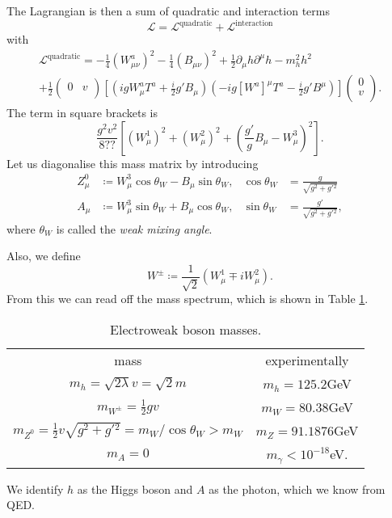 
The Lagrangian is then a sum of quadratic and interaction terms
\begin{equation}
  \mathscr{L} = \mathscr{L}^{\text{quadratic}} + \mathscr{L}^{\text{interaction}}
\end{equation}
with
\begin{multline}
  \mathscr{L}^{\text{quadratic}} = -\frac{1}{4} (W_{\mu\nu}^{a})^2 - \frac{1}{4} (B_{\mu\nu})^2 + \frac{1}{2} \partial_{\mu} h \partial^{\mu} h - m^2_h h^2 \\
  + \frac{1}{2}
  \begin{pmatrix}
   0 & v \\
  \end{pmatrix}
  \left[ (i g W^{a}_{\mu} T^{a} + \frac{i}{2} g' B_{\mu}) (-ig [W^{a}]^{\mu} T^{a} - \frac{i}{2} g' B^{\mu}) \right] 
  \begin{pmatrix}
  0 \\
  v \\
  \end{pmatrix}.
\end{multline}
The term in square brackets is
\begin{equation}
  \frac{g^2 v^2}{8 ??}  \left[ (W^1_{\mu})^2 + (W^2_{\mu})^2 + (\frac{g'}{g} B_{\mu} - W^3_{\mu})^2 \right].
\end{equation}
Let us diagonalise this mass matrix by introducing
\begin{align}
  Z^0_{\mu}  &\coloneqq W^3_{\mu} \cos \theta_W - B_{\mu} \sin \theta_W, & \cos\theta_W &= \frac{g}{\sqrt{g^2 + g'{}^2}} \\
  A_{\mu} &\coloneqq W_{\mu}^3 \sin\theta_W + B_{\mu} \cos\theta_W, & \sin \theta_W &= \frac{g'}{\sqrt{g^2 + g'{}^2}},
\end{align}
where $\theta_W$ is called the \emph{weak mixing angle}.

Also, we define
\begin{equation}
  W^{\pm} \coloneqq \frac{1}{\sqrt{2}} \left( W_{\mu}^1 \mp i W^2_{\mu} \right).
\end{equation}
From this we can read off the mass spectrum, which is shown in Table \ref{tab:l19t1}.
\begin{table}[htpb]
  \centering
  \begin{tabular}{c c}
   mass & experimentally \\
   $m_h = \sqrt{2 \lambda} v = \sqrt{2} m$ & $m_h = 125.2$GeV \\
   $m_{W^{\pm}} = \frac{1}{2} g v$ & $m_W = 80.38$GeV \\
   $m_{Z^0} = \frac{1}{2} v \sqrt{g^2 + g'{}^2} = m_W / \cos \theta_W > m_W$ & $m_Z = 91.1876$GeV \\
   $m_A = 0$ & $m_\gamma < 10^{-18}$eV.
  \end{tabular}
  \caption{Electroweak boson masses.}
  \label{tab:l19t1}
\end{table}
We identify $h$ as the Higgs boson and $A$ as the photon, which we know from QED.


